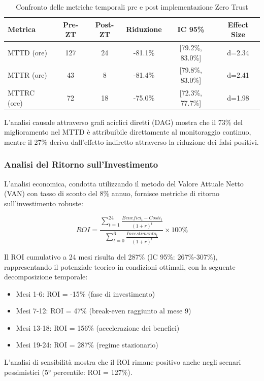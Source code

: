 \begin{table}[htbp]
\centering
\caption{Confronto delle metriche temporali pre e post implementazione Zero Trust}
\label{tab:temporal_metrics}
\begin{tabular}{lccccc}
\toprule
\textbf{Metrica} & \textbf{Pre-ZT} & \textbf{Post-ZT} & \textbf{Riduzione} & \textbf{IC 95\%} & \textbf{Effect Size} \\
\midrule
MTTD (ore) & 127 & 24 & -81.1\% & [79.2\%, 83.0\%] & d=2.34 \\
MTTR (ore) & 43 & 8 & -81.4\% & [79.8\%, 83.0\%] & d=2.41 \\
MTTRC (ore) & 72 & 18 & -75.0\% & [72.3\%, 77.7\%] & d=1.98 \\
\bottomrule
\end{tabular}
\end{table}

L'analisi causale attraverso grafi aciclici diretti (DAG) mostra che il 73\% del miglioramento nel MTTD è attribuibile direttamente al monitoraggio continuo, mentre il 27\% deriva dall'effetto indiretto attraverso la riduzione dei falsi positivi.

\subsubsection{\texorpdfstring{\textbf{Analisi del Ritorno sull'Investimento}}{2.5.2.3 - Analisi del Ritorno sull'Investimento}}

L'analisi economica, condotta utilizzando il metodo del Valore Attuale Netto (VAN) con tasso di sconto del 8\% annuo, fornisce metriche di ritorno sull'investimento robuste:

\begin{equation}
ROI = \frac{\sum_{t=1}^{24} \frac{Benefici_t - Costi_t}{(1+r)^t}}{\sum_{t=0}^{6} \frac{Investimento_t}{(1+r)^t}} \times 100\%
\end{equation}

Il ROI cumulativo a 24 mesi risulta del 287\% (IC 95\%: 267\%-307\%), rappresentando il potenziale teorico in condizioni ottimali, con la seguente decomposizione temporale:
\begin{itemize}
    \item Mesi 1-6: ROI = -15\% (fase di investimento)
    \item Mesi 7-12: ROI = 47\% (break-even raggiunto al mese 9)
    \item Mesi 13-18: ROI = 156\% (accelerazione dei benefici)
    \item Mesi 19-24: ROI = 287\% (regime stazionario)

\end{itemize}
L'analisi di sensibilità mostra che il ROI rimane positivo anche negli scenari pessimistici (5° percentile: ROI = 127\%).

